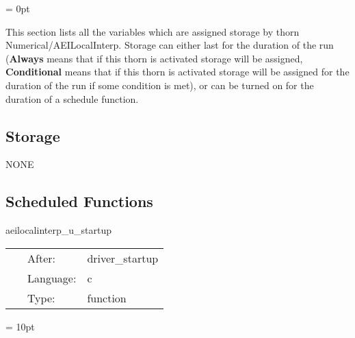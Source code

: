 \parskip = 0pt


\noindent This section lists all the variables which are assigned storage by thorn Numerical/AEILocalInterp.  Storage can either last for the duration of the run ({\bf Always} means that if this thorn is activated storage will be assigned, {\bf Conditional} means that if this thorn is activated storage will be assigned for the duration of the run if some condition is met), or can be turned on for the duration of a schedule function.


\subsection*{Storage}NONE
\subsection*{Scheduled Functions}
\vspace{5mm}


\hspace{5mm} aeilocalinterp\_u\_startup 

\hspace{5mm}{\it register cctk\_interplocaluniform() interpolation operators } 


\hspace{5mm}

 \begin{tabular*}{160mm}{cll} 
~ & After:  & driver\_startup \\ 
~ & Language:  & c \\ 
~ & Type:  & function \\ 
\end{tabular*} 



\vspace{5mm}\parskip = 10pt 

